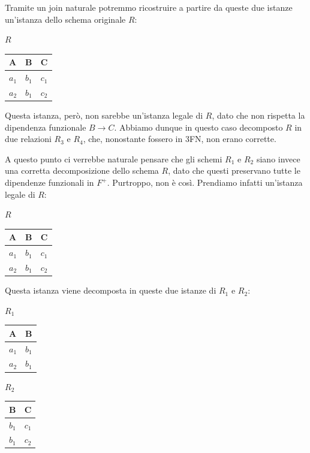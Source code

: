 \documentclass[11pt, a4paper, titlepage, oneside]{scrbook}
\begin{document}
Tramite un join naturale potremmo ricostruire a partire da queste due istanze un'istanza dello schema originale $R$:

\begin{center}
    $R$

\begin{tabular}{|l|l|l|}
\hline
\textbf{A} & \textbf{B} & \textbf{C}   \\ \hline
$a_1$ & $b_1$ & $c_1$ \\
$a_2$ & $b_1$ & $c_2$ \\ \hline
\end{tabular}
\end{center}

Questa istanza, però, non sarebbe un'istanza legale di $R$, dato che non rispetta la dipendenza funzionale $B \longrightarrow C$. Abbiamo dunque in questo caso decomposto $R$ in due relazioni $R_3$ e $R_4$, che, nonostante fossero in 3FN, non erano corrette. 

A questo punto ci verrebbe naturale pensare che gli schemi $R_1$ e $R_2$ siano invece una corretta decomposizione dello schema $R$, dato che questi preservano tutte le dipendenze funzionali in $F^+$. Purtroppo, non è così. Prendiamo infatti un'istanza legale di $R$:

\begin{center}
    $R$

\begin{tabular}{|l|l|l|}
\hline
\textbf{A} & \textbf{B} & \textbf{C}   \\ \hline
$a_1$ & $b_1$ & $c_1$ \\
$a_2$ & $b_1$ & $c_2$ \\ \hline
\end{tabular}
\end{center}

Questa istanza viene decomposta in queste due istanze di $R_1$ e $R_2$:

\begin{minipage}[c]{0.45\textwidth}
\begin{center}
    $R_1$

\begin{tabular}{|l|l|}
\hline
\textbf{A} & \textbf{B}  \\ \hline
$a_1$ & $b_1$ \\
$a_2$ & $b_1$ \\ \hline
\end{tabular}
\end{center}
\end{minipage}\hfill
\begin{minipage}[c]{0.45\textwidth}
\begin{center}
    $R_2$

\begin{tabular}{|l|l|}
\hline
\textbf{B} & \textbf{C}   \\ \hline
$b_1$ & $c_1$ \\
$b_1$ & $c_2$ \\ \hline
\end{tabular}
\end{center}
\end{minipage}
\end{document}
